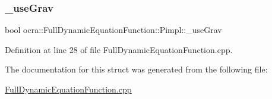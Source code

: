 \subsubsection{\texorpdfstring{\+\_\+use\+Grav}{\_useGrav}}
{\footnotesize\ttfamily bool ocra\+::\+Full\+Dynamic\+Equation\+Function\+::\+Pimpl\+::\+\_\+use\+Grav}



Definition at line 28 of file Full\+Dynamic\+Equation\+Function.\+cpp.



The documentation for this struct was generated from the following file\+:\begin{DoxyCompactItemize}
\item 
\hyperlink{FullDynamicEquationFunction_8cpp}{Full\+Dynamic\+Equation\+Function.\+cpp}\end{DoxyCompactItemize}
